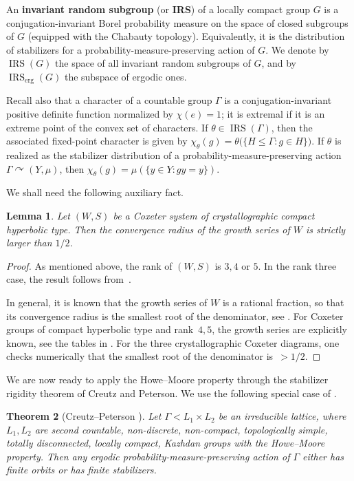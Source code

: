 \documentclass[12pt,a4paper]{amsproc}
\newtheorem{theorem}{Theorem}[section]
\newtheorem{lemma}[theorem]{Lemma}
\theoremstyle{definition}
\DeclareMathOperator{\IRS}{IRS}
\newcommand{\IRSerg}{\IRS_{\mathrm{erg}}}
\begin{document}
An \textbf{invariant random subgroup} (or \textbf{IRS}) of a locally compact group \(G\)
is a conjugation-invariant Borel probability measure on the space of closed
subgroups of \(G\) (equipped with the Chabauty topology). Equivalently, it
is the distribution of stabilizers for a probability-measure-preserving
action of \(G\). We denote by \(\IRS(G)\) the space of all invariant random
subgroups of \(G\), and by \(\IRSerg(G)\) the subspace of ergodic ones.

Recall also that a character of a countable group \(\Gamma\) is a
conjugation-invariant positive definite function normalized by
\(\chi(e)=1\); it is extremal if it is an extreme point of the convex set
of characters. If \(\theta\in\IRS(\Gamma)\), then the associated
fixed-point character is given by
$
\chi_\theta(g)=\theta\bigl(\{H\leq \Gamma:g\in H\}\bigr).
$
If \(\theta\) is realized as the stabilizer distribution of a probability-measure-preserving 
action \(\Gamma\curvearrowright (Y,\mu)\), then
\(\chi_\theta(g)=\mu(\{y\in Y:gy=y\})\).

\medskip

We shall need the following auxiliary fact. 

\begin{lemma}\label{lem:convergence-radius}
Let $(W, S)$ be a Coxeter system of crystallographic compact hyperbolic type. Then the convergence radius of the growth series of $W$ is strictly larger than $1/2$. 
\end{lemma}
\begin{proof}
As mentioned above, the rank of $(W, S)$ is $3, 4$ or $5$. In the rank three case, the result follows from~\cite[Theorem~A]{Bischof}.

In general, it is known that the growth series of $W$ is a rational fraction,  so that its convergence radius is the smallest root of the denominator,  see \cite[\S17.1]{Davis}. For Coxeter groups of compact hyperbolic type and rank~$4, 5$, the growth series are explicitly known, see the tables in \cite{CLS}.  For the three crystallographic Coxeter diagrams, one checks numerically that the smallest root of the denominator is~$>1/2$. 
\end{proof}

We are now ready to apply the Howe--Moore property through the stabilizer
rigidity theorem of Creutz and Peterson. We use the following special case of \cite[Theorem~9.1]{CrePet}.

\begin{theorem}[Creutz--Peterson {\cite[Theorem~9.1]{CrePet}}]
\label{thm:CP-character}
Let \(\Gamma<L_1\times L_2\) be an irreducible lattice, where \(L_1,L_2\)
are second countable, non-discrete, non-compact, topologically simple,
totally disconnected, locally compact, Kazhdan groups with the Howe--Moore property.
Then any ergodic probability-measure-preserving action of $\Gamma$ either has finite orbits or has
finite stabilizers.
\end{theorem}
\end{document}

